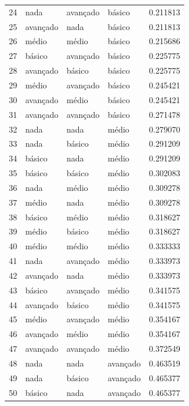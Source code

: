 \documentclass[]{article}
\begin{document}
\begin{longtable}{|llll|r|}
		24 & nada      & avançado & básico   & 0.211813     \\
		25 & avançado & nada      & básico   & 0.211813     \\
		26 & médio    & médio    & básico   & 0.215686     \\
		27 & básico   & avançado & básico   & 0.225775     \\
		28 & avançado & básico   & básico   & 0.225775     \\
		29 & médio    & avançado & básico   & 0.245421     \\
		30 & avançado & médio    & básico   & 0.245421     \\
		31 & avançado & avançado & básico   & 0.271478     \\
		32 & nada      & nada      & médio    & 0.279070     \\
		33 & nada      & básico   & médio    & 0.291209     \\
		34 & básico   & nada      & médio    & 0.291209     \\
		35 & básico   & básico   & médio    & 0.302083     \\
		36 & nada      & médio    & médio    & 0.309278     \\
		37 & médio    & nada      & médio    & 0.309278     \\
		38 & básico   & médio    & médio    & 0.318627     \\
		39 & médio    & básico   & médio    & 0.318627     \\
		40 & médio    & médio    & médio    & 0.333333     \\
		41 & nada      & avançado & médio    & 0.333973     \\
		42 & avançado & nada      & médio    & 0.333973     \\
		43 & básico   & avançado & médio    & 0.341575     \\
		44 & avançado & básico   & médio    & 0.341575     \\
		45 & médio    & avançado & médio    & 0.354167     \\
		46 & avançado & médio    & médio    & 0.354167     \\
		47 & avançado & avançado & médio    & 0.372549     \\
		48 & nada      & nada      & avançado & 0.463519     \\
		49 & nada      & básico   & avançado & 0.465377     \\
		50 & básico   & nada      & avançado & 0.465377     \\

\end{longtable}
\end{document}
